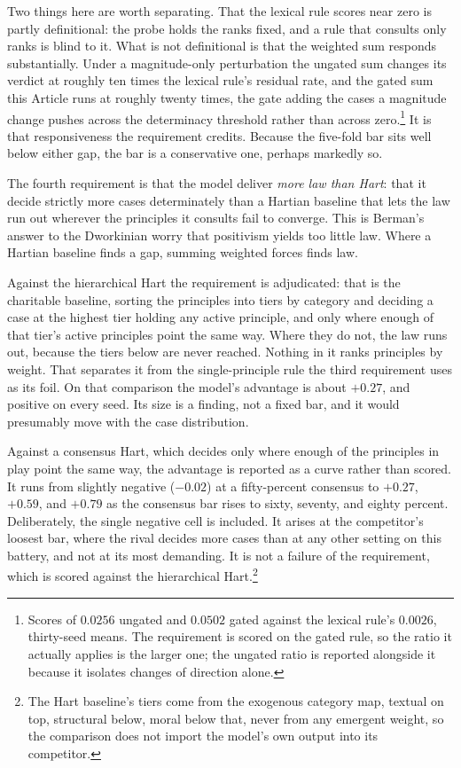 Two
things here are worth separating. That the lexical rule scores near zero is
partly definitional: the probe holds the ranks fixed, and a rule that
consults only ranks is blind to it. What is not definitional is that the
weighted sum responds substantially. Under a magnitude-only perturbation the
ungated sum changes its verdict at roughly ten times the lexical rule's
residual rate, and the gated sum this Article runs at roughly twenty times,
the gate adding the cases a magnitude change pushes across the determinacy
threshold rather than across zero.\footnote{Scores of $0.0256$ ungated and
$0.0502$ gated against the lexical rule's $0.0026$, thirty-seed means. The
requirement is scored on the gated rule, so the ratio it actually applies is
the larger one; the ungated ratio is reported alongside it because it isolates
changes of direction alone.} It is that responsiveness the requirement
credits. Because the five-fold bar sits well below either gap, the bar is a
conservative one, perhaps markedly so.

The fourth requirement is that the model deliver \textit{more law than
Hart}: that it decide strictly more cases determinately than a Hartian
baseline that lets the law run out wherever the principles it consults fail to
converge. This is Berman's answer to the Dworkinian worry that positivism yields too
little law. Where a Hartian baseline finds a gap, summing
weighted forces finds law.

Against the hierarchical Hart the requirement is adjudicated: that is the
charitable baseline, sorting the principles into tiers by category and
deciding a case at the highest tier holding any active principle, and only
where enough of that tier's active principles point the same way. Where they
do not, the law runs out, because the tiers below are never reached. Nothing
in it ranks principles by weight. That separates it from the
single-principle rule the third requirement uses as its foil. On that
comparison the model's
advantage is about $+0.27$, and positive on every seed. Its size is a finding, not a fixed bar, and it would presumably move with
the case distribution.

Against a consensus
Hart, which decides only where enough of the principles in play point the
same way, the advantage is reported as a curve rather than scored. It runs from
slightly negative ($-0.02$) at a fifty-percent consensus to $+0.27$, $+0.59$, and $+0.79$ as
the consensus bar rises to sixty, seventy, and eighty percent. Deliberately,
the single negative cell is included. It arises at the competitor's loosest
bar, where the rival decides more cases than at any other setting on this
battery, and not at its most demanding. It is not a failure of the
requirement, which is scored against the hierarchical Hart.\footnote{The Hart baseline's tiers come from
the exogenous category map, textual on top, structural below, moral below
that, never from any emergent weight, so the comparison does not import the
model's own output into its competitor.}

